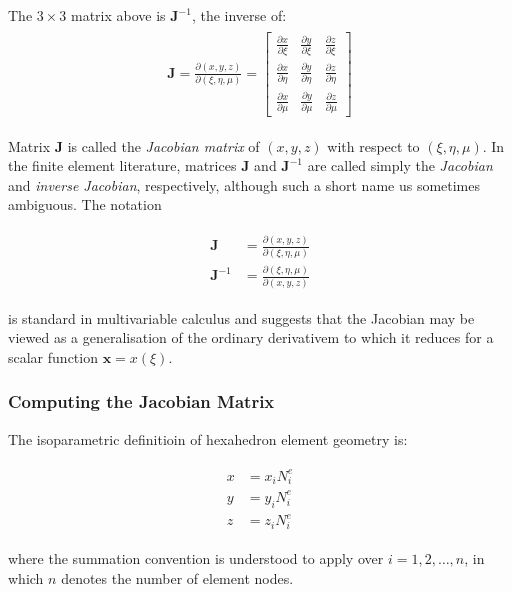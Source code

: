 \documentclass[10pt,b5paper,titlepage]{book}
\newenvironment{eqarray}
{
    \begin{eqnarray}
        \begin{aligned}
}
{
        \end{aligned}
    \end{eqnarray}
}
\begin{document}
The $ 3 \times 3 $ matrix above is $ \mathbf{J}^{-1} $, the inverse of:
\begin{eqarray}
    \mathbf{J} = \frac{\partial \left( x, y, z \right)}{\partial \left( \xi, \eta, \mu \right)}
    = \begin{bmatrix}
        \frac{\partial x}{\partial \xi} &
        \frac{\partial y}{\partial \xi} &
        \frac{\partial z}{\partial \xi} \\
        \frac{\partial x}{\partial \eta} &
        \frac{\partial y}{\partial \eta} &
        \frac{\partial z}{\partial \eta} \\
        \frac{\partial x}{\partial \mu} &
        \frac{\partial y}{\partial \mu} &
        \frac{\partial z}{\partial \mu}
    \end{bmatrix}
\end{eqarray}

Matrix $ \mathbf{J} $ is called the \textit{Jacobian matrix} of $ (x, y, z) $
with respect to $ (\xi, \eta, \mu) $. In the finite element literature, matrices
$ \mathbf{J} $ and $ \mathbf{J}^{-1} $ are called simply the \textit{Jacobian} and
\textit{inverse Jacobian}, respectively, although such a short name us sometimes
ambiguous. The notation

\begin{eqarray}
    \mathbf{J} &=
    \frac{\partial \left(x, y, z \right)}{\partial \left(\xi, \eta, \mu \right)}\\
    \mathbf{J}^{-1} &=
    \frac{\partial \left(\xi, \eta, \mu \right)}{\partial \left(x, y, z \right)}
\end{eqarray}

is standard in multivariable calculus and suggests that the Jacobian may be viewed as
a generalisation of the ordinary derivativem to which it reduces for a scalar
function $ \mathbf{x} = x(\xi) $.



\subsubsection{Computing the Jacobian Matrix}
The isoparametric definitioin of hexahedron element geometry is:

\begin{eqarray}
    x &= x_i N_i^e\\
    y &= y_i N_i^e\\
    z &= z_i N_i^e
\end{eqarray}

where the summation convention is understood to apply over $ i = 1, 2, \dots , n $,
in which $ n $ denotes the number of element nodes.
\end{document}
